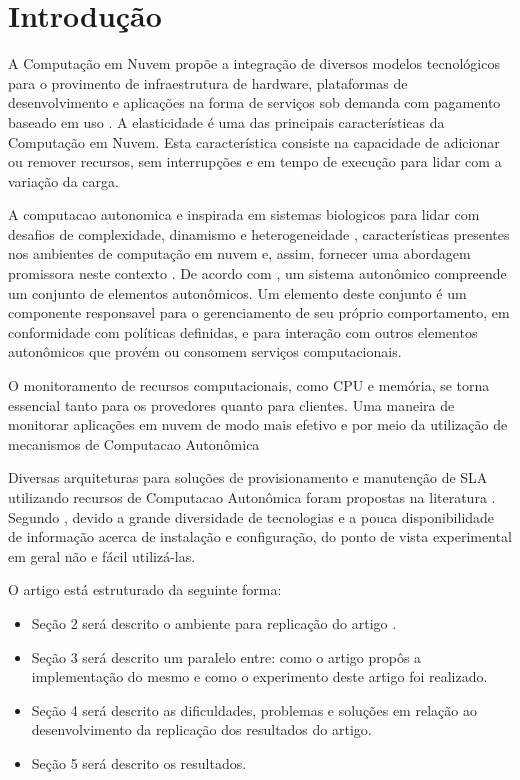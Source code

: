 \section{Introdução}

A Computação em Nuvem propõe a integração de diversos modelos tecnológicos para o
provimento de infraestrutura de hardware, plataformas de desenvolvimento e aplicações
na forma de serviços sob demanda com pagamento baseado em uso \cite{sa:11}. A elasticidade é uma das principais características da Computação em Nuvem. Esta característica consiste na capacidade de adicionar ou remover recursos, sem interrupções e em tempo de execução para lidar com a variação da carga. 

A computacao autonomica e inspirada em sistemas biologicos para lidar com desafios de complexidade, dinamismo e heterogeneidade \cite{kephart:03}, características presentes nos ambientes de computação em nuvem e, assim, fornecer uma abordagem promissora neste contexto \cite{sousa:11}. De acordo com \cite{kephart:03}, um sistema autonômico compreende um conjunto de elementos autonômicos. Um elemento deste conjunto é um componente responsavel para o gerenciamento de seu próprio comportamento, em conformidade com políticas definidas, e para interação com outros elementos autonômicos que provém ou consomem serviços computacionais.

O monitoramento de recursos computacionais, como CPU e memória, se torna 
essencial tanto para os provedores quanto para clientes. Uma maneira de monitorar
aplicações em nuvem de modo mais efetivo e por meio da utilização de mecanismos de 
Computacao Autonômica

Diversas arquiteturas para soluções de provisionamento e manutenção de 
SLA utilizando recursos de Computacao Autonômica foram propostas na literatura 
\cite{rego:12,tordsson:12}. Segundo \cite{coutinho_et_al:14}, devido a grande diversidade de tecnologias e a pouca disponibilidade de informação acerca de instalação e configuração, do ponto de vista experimental em geral não e fácil utilizá-las.

O artigo está estruturado da seguinte forma:
\begin{itemize}
  \item Seção 2 será descrito o ambiente para replicação do artigo \cite{coutinho_et_al:14}.
  \item Seção 3 será descrito um paralelo entre: como o artigo propôs a implementação do mesmo e como o experimento deste artigo foi realizado.
  \item Seção 4 será descrito as dificuldades, problemas e soluções em relação ao desenvolvimento da replicação dos resultados do artigo.
  \item Seção 5 será descrito os resultados.
\end{itemize}
